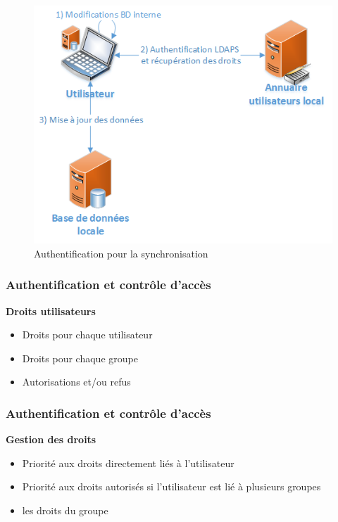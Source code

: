 \begin{figure}[htbp]
	\centering
	\includegraphics[scale=0.55]{Images/SchemaAuthentification.png}
	\caption{Authentification pour la synchronisation}
	\label{SchemaAuthentification}
\end{figure}

\begin{frame}
  \frametitle{Authentification et contrôle d'accès}
  \begin{block}{\textbf{Droits utilisateurs}}
  \begin{itemize}
  \item Droits pour chaque utilisateur
  \item Droits pour chaque groupe
  \item Autorisations et/ou refus
  \end{itemize}
  \end{block}
\end{frame}

\begin{frame}
  \frametitle{Authentification et contrôle d'accès}
  \begin{block}{\textbf{Gestion des droits}}
  \begin{itemize}
  \item Priorité aux droits directement liés à l'utilisateur 
  \item Priorité aux droits autorisés si l'utilisateur est lié à plusieurs groupes
  \item les droits du groupe
  \end{itemize}
  \end{block}
\end{frame}

